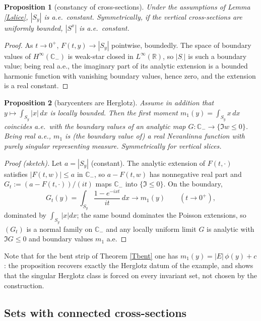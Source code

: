\documentclass{article}
\newtheorem{proposition}{Proposition}
\def\R{{\mathbb R}}
\def\C{{\mathbb C}}
\begin{document}
	\begin{proposition}[constancy of cross-sections]\label{Pconst}
		Under the assumptions of Lemma \ref{Lslice}, $|S_y|$ is a.e.\ constant. Symmetrically, if the vertical cross-sections are uniformly bounded, $|S^x|$ is a.e.\ constant.
	\end{proposition}

	\begin{proof}
		As $t\to 0^+$, $F(t,y)\to|S_y|$ pointwise, boundedly. The space of boundary values of $H^\infty(\C_-)$ is weak-star closed in $L^\infty(\R)$, so $|S_\cdot|$ is such a boundary value; being real a.e., the imaginary part of its analytic extension is a bounded harmonic function with vanishing boundary values, hence zero, and the extension is a real constant.
	\end{proof}

	\begin{proposition}[barycenters are Herglotz]\label{Pbary}
		Assume in addition that $y\mapsto\int_{S_y}|x|\,dx$ is locally bounded. Then the first moment $m_1(y)=\int_{S_y}x\,dx$ coincides a.e.\ with the boundary values of an analytic map $G:\C_-\to\{\Im w\leq 0\}$. Being real a.e., $m_1$ is (the boundary value of) a real Nevanlinna function with purely singular representing measure. Symmetrically for vertical slices.
	\end{proposition}

	\begin{proof}[Proof (sketch)]
		Let $a=|S_y|$ (constant). The analytic extension of $F(t,\cdot)$ satisfies $|F(t,w)|\leq a$ in $\C_-$, so $a-F(t,w)$ has nonnegative real part and $G_t:=(a-F(t,\cdot))/(it)$ maps $\C_-$ into $\{\Im\leq 0\}$. On the boundary,
		$$G_t(y)=\int_{S_y}\frac{1-e^{-ixt}}{it}\,dx\longrightarrow m_1(y)\qquad(t\to 0^+),$$
		dominated by $\int_{S_y}|x|dx$; the same bound dominates the Poisson extensions, so $(G_t)$ is a normal family on $\C_-$ and any locally uniform limit $G$ is analytic with $\Im G\leq 0$ and boundary values $m_1$ a.e.
	\end{proof}

	Note that for the bent strip of Theorem \ref{Tbent} one has $m_1(y)=|E|\,\phi(y)+c$: the proposition recovers exactly the Herglotz datum of the example, and shows that the singular Herglotz class is forced on every invariant set, not chosen by the construction.

	\subsection{Sets with connected cross-sections}
\end{document}
